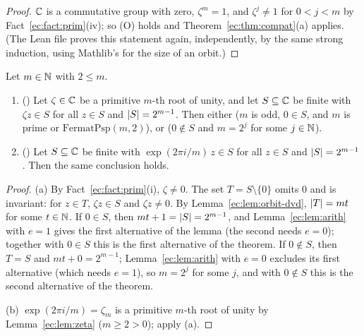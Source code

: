 \begin{proof}
$\mathbb C$ is a commutative group with zero, $\zeta^m=1$, and $\zeta^j\ne1$ for $0<j<m$ by Fact~\ref{ec:fact:prim}(iv); so
(O) holds and Theorem~\ref{ec:thm:compat}(a) applies. (The Lean file proves this statement again, independently, by
the same strong induction, using Mathlib's  for the size of an orbit.)
\end{proof}

\begin{theorem}\label{ec:thm:l0}
Let $m\in\mathbb N$ with $2\le m$.
\begin{enumerate}[label=(\alph*)]
\item \textup{()} Let $\zeta\in\mathbb C$ be a primitive $m$-th root of unity, and let $S\subseteq\mathbb C$ be finite with
  $\zeta z\in S$ for all $z\in S$ and $\lvert S\rvert=2^{m-1}$. Then either \textup{(}$m$ is odd, $0\in S$, and $m$ is prime
  or $\mathrm{FermatPsp}(m,2)$\textup{)}, or \textup{(}$0\notin S$ and $m=2^j$ for some $j\in\mathbb N$\textup{)}.
\item \textup{()} Let $S\subseteq\mathbb C$ be finite with $\exp(2\pi i/m)\,z\in S$ for all $z\in S$ and
  $\lvert S\rvert=2^{m-1}$. Then the same conclusion holds.
\end{enumerate}
\end{theorem}

\begin{proof}
(a) By Fact~\ref{ec:fact:prim}(i), $\zeta\ne0$. The set $T=S\setminus\{0\}$ omits $0$ and is invariant: for $z\in T$,
$\zeta z\in S$ and $\zeta z\ne0$. By Lemma~\ref{ec:lem:orbit-dvd}, $\lvert T\rvert=mt$ for some $t\in\mathbb N$. If $0\in S$, then
$mt+1=\lvert S\rvert=2^{m-1}$, and Lemma~\ref{ec:lem:arith} with $e=1$ gives the first alternative of the lemma (the second
needs $e=0$); together with $0\in S$ this is the first alternative of the theorem. If $0\notin S$, then $T=S$ and
$mt+0=2^{m-1}$; Lemma~\ref{ec:lem:arith} with $e=0$ excludes its first alternative (which needs $e=1$), so $m=2^j$ for
some $j$, and with $0\notin S$ this is the second alternative of the theorem.

(b) $\exp(2\pi i/m)=\zeta_m$ is a primitive $m$-th root of unity by Lemma~\ref{ec:lem:zeta} ($m\ge2>0$); apply (a).
\end{proof}

